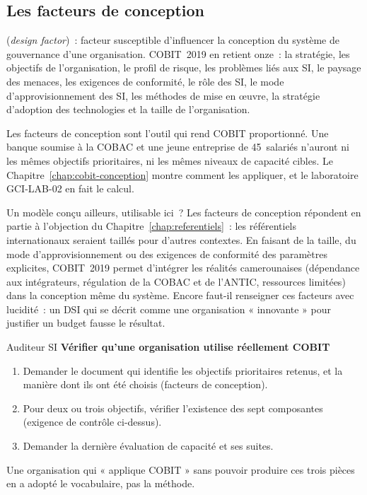\subsection{Les facteurs de conception}

\begin{boxdef}
(\textit{design factor})~: facteur susceptible d'influencer la conception
du système de gouvernance d'une organisation. COBIT~2019 en retient onze~:
la stratégie, les objectifs de l'organisation, le profil de risque, les
problèmes liés aux SI, le paysage des menaces, les exigences de
conformité, le rôle des SI, le mode d'approvisionnement des SI, les
méthodes de mise en œuvre, la stratégie d'adoption des technologies et la
taille de l'organisation.
\end{boxdef}

Les facteurs de conception sont l'outil qui rend COBIT proportionné. Une
banque soumise à la COBAC et une jeune entreprise de 45~salariés n'auront
ni les mêmes objectifs prioritaires, ni les mêmes niveaux de capacité
cibles. Le Chapitre~\ref{chap:cobit-conception} montre comment les
appliquer, et le laboratoire GCI-LAB-02 en fait le calcul.

\begin{boiteRemarque}{Un modèle conçu ailleurs, utilisable ici~?}
Les facteurs de conception répondent en partie à l'objection du
Chapitre~\ref{chap:referentiels}~: les référentiels internationaux
seraient taillés pour d'autres contextes. En faisant de la taille, du
mode d'approvisionnement ou des exigences de conformité des paramètres
explicites, COBIT~2019 permet d'intégrer les réalités camerounaises
(dépendance aux intégrateurs, régulation de la COBAC et de l'ANTIC,
ressources limitées) dans la conception même du système. Encore faut-il
renseigner ces facteurs avec lucidité~: un DSI qui se décrit comme une
organisation « innovante » pour justifier un budget fausse le résultat.
\end{boiteRemarque}

\begin{boxmetier}{Auditeur SI}
\textbf{Vérifier qu'une organisation utilise réellement COBIT}
\begin{enumerate}
    \item Demander le document qui identifie les objectifs prioritaires
          retenus, et la manière dont ils ont été choisis (facteurs de
          conception).
    \item Pour deux ou trois objectifs, vérifier l'existence des sept
          composantes (exigence de contrôle ci-dessus).
    \item Demander la dernière évaluation de capacité et ses suites.
\end{enumerate}
Une organisation qui « applique COBIT » sans pouvoir produire ces trois
pièces en a adopté le vocabulaire, pas la méthode.
\end{boxmetier}

